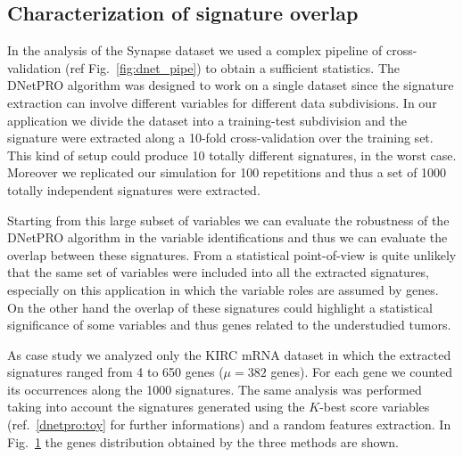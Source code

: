 \documentclass{standalone}
\begin{document}
\subsection[Signature Overlap]{Characterization of signature overlap}\label{synapse:overlap}

In the analysis of the Synapse dataset we used a complex pipeline of cross-validation (ref Fig.~\ref{fig:dnet_pipe}) to obtain a sufficient statistics.
The DNetPRO algorithm was designed to work on a single dataset since the signature extraction can involve different variables for different data subdivisions.
In our application we divide the dataset into a training-test subdivision and the signature were extracted along a 10-fold cross-validation over the training set.
This kind of setup could produce 10 totally different signatures, in the worst case.
Moreover we replicated our simulation for 100 repetitions and thus a set of 1000 totally independent signatures were extracted.

Starting from this large subset of variables we can evaluate the robustness of the DNetPRO algorithm in the variable identifications and thus we can evaluate the overlap between these signatures.
From a statistical point-of-view is quite unlikely that the same set of variables were included into all the extracted signatures, especially on this application in which the variable roles are assumed by genes.
On the other hand the overlap of these signatures could highlight a statistical significance of some variables and thus genes related to the understudied tumors.

As case study we analyzed only the KIRC mRNA dataset in which the extracted signatures ranged from 4 to 650 genes ($\mu=382$ genes).
For each gene we counted its occurrences along the 1000 signatures.
The same analysis was performed taking into account the signatures generated using the $K$-best score variables (ref.~\ref{dnetpro:toy} for further informations) and a random features extraction.
In Fig.~\ref{fig:overlap} the genes distribution obtained by the three methods are shown.

\begin{figure}[htbp]
\centering
\def\svgwidth{0.4\textwidth}

\caption{
}
\label{fig:overlap}
\end{figure}




\end{document}
